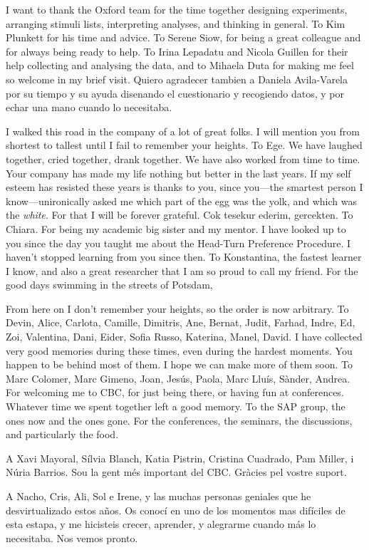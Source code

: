 \documentclass[
  12pt,
  b5paperpaper,
  twoside]{scrreprt}
\begin{document}
\begin{spacing}{1.5}
{I want to thank the Oxford team for the time together designing
experiments, arranging stimuli lists, interpreting analyses, and
thinking in general. To Kim Plunkett for his time and advice. To Serene
Siow, for being a great colleague and for always being ready to help. To
Irina Lepadatu and Nicola Guillen for their help collecting and
analysing the data, and to Mihaela Duta for making me feel so welcome in
my brief visit. Quiero agradecer tambien a Daniela Avila-Varela por su
tiempo y su ayuda disenando el cuestionario y recogiendo datos, y por
echar una mano cuando lo necesitaba.

I walked this road in the company of a lot of great folks. I will
mention you from shortest to tallest until I fail to remember your
heights. To Ege. We have laughed together, cried together, drank
together. We have also worked from time to time. Your company has made
my life nothing but better in the last years. If my self esteem has
resisted these years is thanks to you, since you---the smartest person I
know---unironically asked me which part of the egg was the yolk, and
which was the \emph{white}. For that I will be forever grateful. Cok
tesekur ederim, gercekten. To Chiara. For being my academic big sister
and my mentor. I have looked up to you since the day you taught me about
the Head-Turn Preference Procedure. I haven't stopped learning from you
since then. To Konstantina, the fastest learner I know, and also a great
researcher that I am so proud to call my friend. For the good days
swimming in the streets of Potsdam,

From here on I don't remember your heights, so the order is now
arbitrary. To Devin, Alice, Carlota, Camille, Dimitris, Ane, Bernat,
Judit, Farhad, Indre, Ed, Zoi, Valentina, Dani, Eider, Sofia Russo,
Katerina, Manel, David. I have collected very good memories during these
times, even during the hardest moments. You happen to be behind most of
them. I hope we can make more of them soon. To Marc Colomer, Marc
Gimeno, Joan, Jesús, Paola, Marc Lluís, Sànder, Andrea. For welcoming me
to CBC, for just being there, or having fun at conferences. Whatever
time we spent together left a good memory. To the SAP group, the ones
now and the ones gone. For the conferences, the seminars, the
discussions, and particularly the food.

A Xavi Mayoral, Sílvia Blanch, Katia Pistrin, Cristina Cuadrado, Pam
Miller, i Núria Barrios. Sou la gent més important del CBC. Gràcies pel
vostre suport.

A Nacho, Cris, Ali, Sol e Irene, y las muchas personas geniales que he
desvirtualizado estos años. Os conocí en uno de los momentos mas
difíciles de esta estapa, y me hicisteis crecer, aprender, y alegrarme
cuando más lo necesitaba. Nos vemos pronto.

}
\end{spacing}
\end{document}
